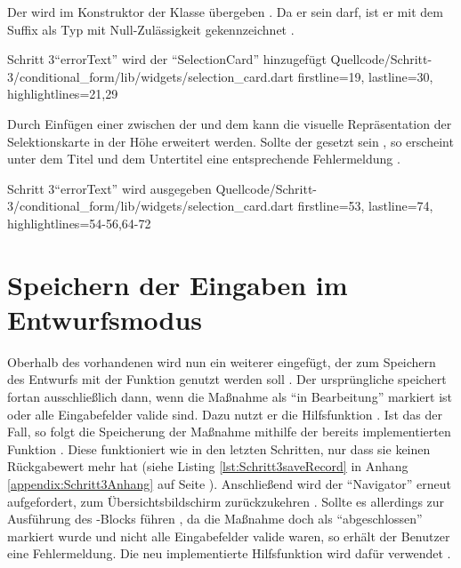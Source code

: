 Der  wird im Konstruktor der Klasse  übergeben .
Da er  sein darf, ist er mit dem Suffix  als Typ mit Null-Zulässigkeit gekennzeichnet .

\begin{alexlisting}{Schritt 3}{\enquote{errorText} wird der \enquote{SelectionCard} hinzugefügt}
    {Quellcode/Schritt-3/conditional_form/lib/widgets/selection_card.dart}
    {firstline=19, lastline=30, highlightlines={21,29}}
    \label{lst:Schritt3errorText}
\end{alexlisting}

Durch Einfügen einer  zwischen der   und dem   kann die visuelle Repräsentation der Selektionskarte in der Höhe erweitert werden.
Sollte der  gesetzt sein , so erscheint unter dem Titel und dem Untertitel eine entsprechende Fehlermeldung .
 

\begin{alexlisting}{Schritt 3}{\enquote{errorText} wird ausgegeben}
    {Quellcode/Schritt-3/conditional_form/lib/widgets/selection_card.dart}
    {firstline=53, lastline=74, highlightlines={54-56,64-72}}
    \label{lst:Schritt3ColumnErrorText}
\end{alexlisting}

\section{Speichern der Eingaben im Entwurfsmodus}


Oberhalb des vorhandenen  wird nun ein weiterer eingefügt,
der zum Speichern des Entwurfs mit der Funktion  genutzt werden soll .
Der ursprüngliche  speichert fortan ausschließlich dann, wenn die Maßnahme als \enquote{in Bearbeitung} markiert ist oder alle Eingabefelder valide sind.
Dazu nutzt er die Hilfsfunktion  .
Ist das der Fall, so folgt die Speicherung der Maßnahme mithilfe der bereits implementierten Funktion  .
Diese funktioniert wie in den letzten Schritten, nur dass sie keinen Rückgabewert mehr hat (siehe Listing \ref{lst:Schritt3saveRecord} in Anhang \ref{appendix:Schritt3Anhang} auf Seite \pageref{appendix:Schritt3Anhang}).
Anschließend wird der \enquote{Navigator} erneut aufgefordert, zum Übersichtsbildschirm zurückzukehren .
Sollte es allerdings zur Ausführung des -Blocks führen ,
da die Maßnahme doch als \enquote{abgeschlossen} markiert wurde und nicht alle Eingabefelder valide waren,
so erhält der Benutzer eine Fehlermeldung. Die neu implementierte Hilfsfunktion  wird dafür verwendet . 
   
